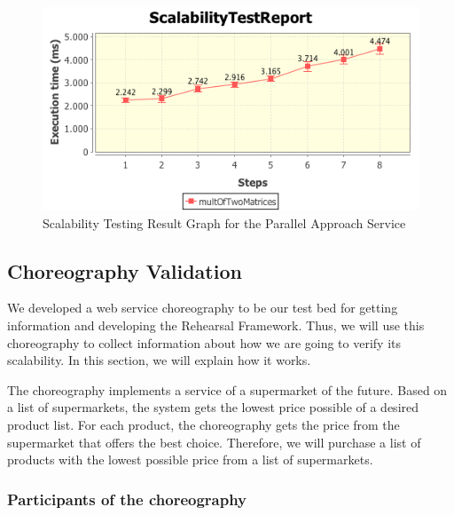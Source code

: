 \begin{figure}[htbp]
\begin{center}
	\includegraphics[scale=0.8]{images/multiplicationOfTwoMatricesReport8}
\caption{Scalability Testing Result Graph for the Parallel Approach Service}
\label{dmmParallelGraph}
\end{center}
\end{figure}



\subsection{Choreography Validation}
We developed a web service choreography to be our test bed for getting information and developing the Rehearsal Framework. Thus, we will use this choreography to collect information about how we are going to verify its scalability. In this section, we will explain how it works.

The choreography implements a service of a supermarket of the future. Based on a list of supermarkets, the system gets the lowest price possible of a desired product list. For each product, the choreography gets the price from the supermarket that offers the best choice. Therefore, we will purchase a list of products with the lowest possible price from a list of supermarkets.

\subsubsection{Participants of the choreography}
\label{participantschoreography}

